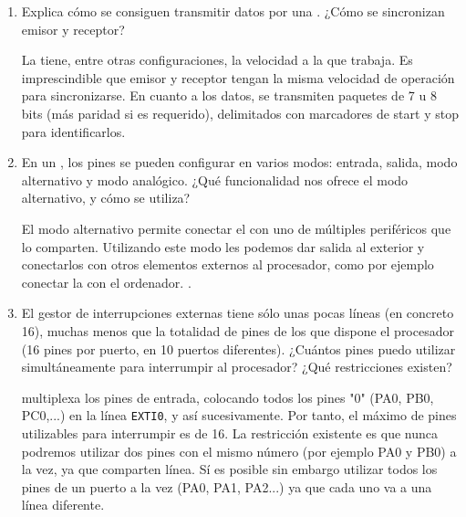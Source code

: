 \documentclass[svgnames,spanish,11pt,a4paper]{article}
\newcounter{solution}
\begin{document}
\begin{enumerate}
\begin{solution}
                \[
                    v_{BRR} = \frac{f_{in}}{baud rate} = \frac{16\cdot 10^6}{115200} \approx 139
                \]
            \end{solution}

        \item Explica cómo se consiguen transmitir datos por una . ¿Cómo se sincronizan emisor y receptor?
            
            \begin{solution}
                La  tiene, entre otras configuraciones, la velocidad a la que trabaja. Es imprescindible que emisor y receptor tengan la misma velocidad de operación para sincronizarse. En cuanto a los datos, se transmiten paquetes de 7 u 8 bits (más paridad si es requerido), delimitados con marcadores de start y stop para identificarlos.
            \end{solution}

        \item En un , los pines se pueden configurar en varios modos: entrada, salida, modo alternativo y modo analógico. ¿Qué funcionalidad nos ofrece el modo alternativo, y cómo se utiliza?
        
            \begin{solution}
                El modo alternativo permite conectar el  con uno de múltiples periféricos que lo comparten. Utilizando este modo les podemos dar salida al exterior y conectarlos con otros elementos externos al procesador, como por ejemplo conectar la  con el ordenador.         .
            \end{solution}

        \item El gestor de interrupciones externas  tiene sólo unas pocas líneas (en concreto 16), muchas menos que la totalidad de pines de los que dispone el procesador (16 pines por puerto, en 10 puertos diferentes). ¿Cuántos pines puedo utilizar simultáneamente para interrumpir al procesador? ¿Qué restricciones existen?
        
            \begin{solution}
                 multiplexa los pines de entrada, colocando todos los pines "0" (PA0, PB0, PC0,...) en la línea \texttt{EXTI0}, y así sucesivamente. Por tanto, el máximo de pines utilizables para interrumpir es de 16. La restricción existente es que nunca podremos utilizar dos pines con el mismo número (por ejemplo PA0 y PB0) a la vez, ya que comparten línea. Sí es posible sin embargo utilizar todos los pines de un puerto a la vez (PA0, PA1, PA2...) ya que cada uno va a una línea diferente.
            \end{solution}


\end{enumerate}
\end{document}
